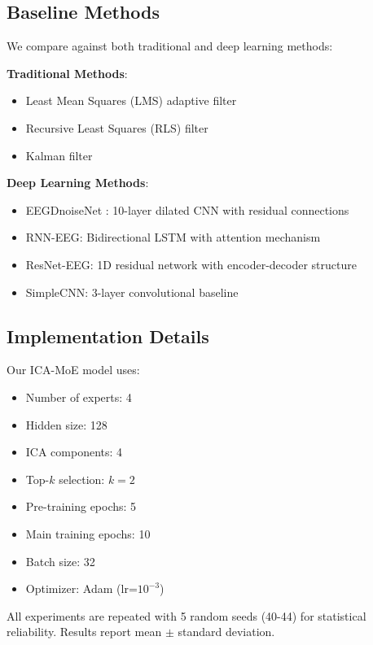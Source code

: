 \documentclass{article}
\begin{document}
\subsection{Baseline Methods}

We compare against both traditional and deep learning methods:

\textbf{Traditional Methods}:
\begin{itemize}
\item Least Mean Squares (LMS) adaptive filter \cite{widrow1975adaptive}
\item Recursive Least Squares (RLS) filter \cite{haykin2014adaptive}
\item Kalman filter \cite{morbidi2008application}
\end{itemize}

\textbf{Deep Learning Methods}:
\begin{itemize}
\item EEGDnoiseNet \cite{zhang2021eegdenoisenet}: 10-layer dilated CNN with residual connections
\item RNN-EEG: Bidirectional LSTM with attention mechanism
\item ResNet-EEG: 1D residual network with encoder-decoder structure
\item SimpleCNN: 3-layer convolutional baseline
\end{itemize}

\subsection{Implementation Details}

Our ICA-MoE model uses:
\begin{itemize}
\item Number of experts: 4
\item Hidden size: 128
\item ICA components: 4
\item Top-$k$ selection: $k=2$
\item Pre-training epochs: 5
\item Main training epochs: 10
\item Batch size: 32
\item Optimizer: Adam (lr=$10^{-3}$)
\end{itemize}

All experiments are repeated with 5 random seeds (40-44) for statistical reliability. Results report mean $\pm$ standard deviation.

\end{document}
